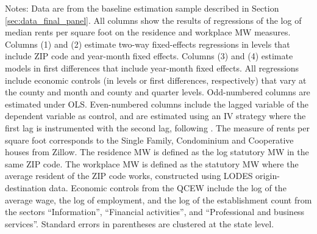 \begin{table}[hbt!]
\begin{tabular}{@{}lcccc@{}}
    \end{tabular}

    \begin{minipage}{.95\textwidth} \footnotesize
        \vspace{2mm}
        Notes: 
        Data are from the baseline estimation sample described in Section 
        \ref{sec:data_final_panel}.
        All columns show the results of regressions of the log of median rents 
        per square foot on the residence and workplace MW measures.
        Columns (1) and (2) estimate two-way fixed-effects regressions in 
        levels that include ZIP code and year-month fixed effects.
        Columns (3) and (4) estimate models in first differences that include 
        year-month fixed effects.
        All regressions include economic controls (in levels or first differences,
        respectively) that vary at the county and month and county and quarter levels.
        Odd-numbered columns are estimated under OLS.
        Even-numbered columns include the lagged variable of the dependent variable
        as control, and are estimated using an IV strategy where the first lag is 
        instrumented with the second lag, following \textcite{ArellanoBond1991}.
        The measure of rents per square foot corresponds to the Single Family, 
        Condominium and Cooperative houses from Zillow.
        The residence MW is defined as the log statutory MW in the same ZIP code.
        The workplace MW is defined as the statutory MW where the average 
        resident of the ZIP code works, constructed using LODES 
        origin-destination data.
        Economic controls from the QCEW include the log of the average wage, 
        the log of employment, and the log of the establishment count from the 
        sectors ``Information'', ``Financial activities'', and ``Professional
        and business services''.
        Standard errors in parentheses are clustered at the state level.
    \end{minipage}
\end{table}
